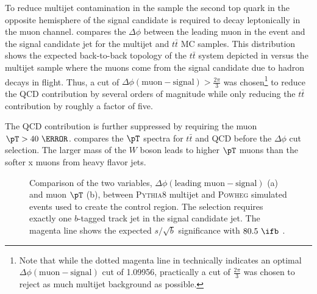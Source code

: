 To reduce multijet contamination in the sample the second top quark in the
opposite hemisphere of the signal candidate is required to decay leptonically
in the muon channel.  compares the $\Delta\phi$
between the leading muon in the event and the signal candidate jet for the
multijet and $t\bar{t}$ MC samples. This distribution shows the expected
back-to-back topology of the $t\bar{t}$ system depicted in
 versus the multijet sample where the muons
come from the signal candidate due to hadron decays in flight. Thus, a cut of
$\Delta\phi(\text{muon} - \text{signal}) > \frac{2\pi}{3}$ was
chosen\footnote{Note that while the dotted magenta line in
 technically indicates an optimal
$\Delta\phi(\text{muon} - \text{signal})$ cut of 1.09956, practically a cut of
$\frac{2\pi}{3}$ was chosen to reject as much multijet background as possible.}
to reduce the QCD contribution by several orders of magnitude while only
reducing the $t\bar{t}$ contribution by roughly a factor of five.

The QCD contribution is further suppressed by requiring the muon $\pT >40~\GeV$.
 compares the $\pT$ spectra for $t\bar{t}$ and
QCD before the $\Delta\phi$ cut selection. The larger mass of the $W$
boson leads to higher $\pT$ muons than the softer x muons from heavy flavor jets.

\begin{figure}[!htbp]
\centering
{}\hfill
{}
\caption{Comparison of the two variables, $\Delta \phi(\text{leading muon}-\text{signal})$ (a) and muon $\pT$ (b), between \textsc{Pythia}8 multijet and \textsc{Powheg} \ttbar simulated events used to create the \ttbar control region. The selection requires exactly one $b$-tagged track jet in the signal candidate \largeR jet. The magenta line shows the expected $s/\sqrt{b}$ significance with $80.5~\ifb$ \cite{Krizka:2310645}.}
\label{sec:background:qcd_rejection_studies}
\end{figure}


